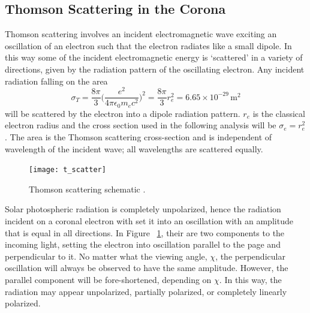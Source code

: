 \subsection{Thomson Scattering in the Corona}\label{sec:10}
\doublespacing
Thomson scattering involves an incident electromagnetic wave exciting an oscillation of an electron such that the electron radiates like a small dipole. In this way some of the incident electromagnetic energy is `scattered' in a variety of directions, given by the radiation pattern of the oscillating electron. Any incident radiation falling on the area
\begin{equation}
\sigma_T = \frac{8\pi}{3}\bigg(  \frac{e^2}{4\pi\epsilon_0 m_e c^2}   \bigg)^2 = \frac{8\pi}{3}r_e^2 = 6.65\times10^{-29}\,\mathrm{m}^2
\end{equation}
will be scattered by the electron into a dipole radiation pattern. $r_e$ is the classical electron radius and the cross section used in the following analysis will be $\sigma_e = r_e^2$. The area is the Thomson scattering cross-section and is independent of wavelength of the incident wave; all wavelengths are scattered equally. 

\begin{figure}[!t]
\begin{center}
\texttt{[image: t\_scatter]}
\caption[Thomson scattering schematic.]{Thomson scattering schematic \citep{howtap2009}.}
\label{fig:tscatter}
\end{center}
\end{figure}
Solar photospheric radiation is completely unpolarized, hence the radiation incident on a coronal electron with set it into an oscillation with an amplitude that is equal in all directions. In Figure ~\ref{fig:tscatter}, their are two components to the incoming light, setting the electron into oscillation parallel to the page and perpendicular to it. No matter what the viewing angle, $\chi$, the perpendicular oscillation will always be observed to have the same amplitude. However, the parallel component will be fore-shortened, depending on $\chi$. In this way, the radiation may appear unpolarized, partially polarized, or completely linearly polarized.

